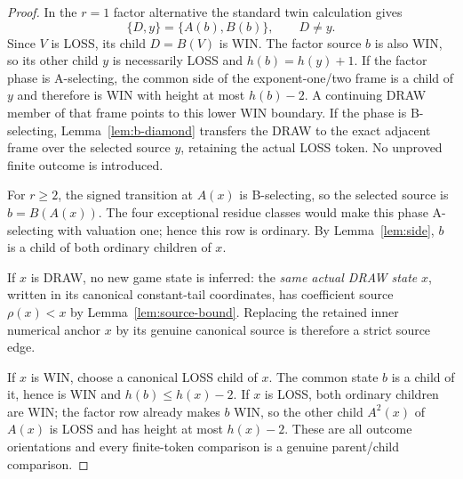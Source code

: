 \documentclass[11pt]{article}
\begin{document}
\begin{proof}
In the $r=1$ factor alternative the standard twin calculation gives
\[
 \{D,y\}=\{A(b),B(b)\},\qquad D\ne y.
\]
Since $V$ is LOSS, its
child $D=B(V)$ is WIN.  The factor source $b$ is also WIN, so its other child
$y$ is necessarily LOSS and $h(b)=h(y)+1$.  If the factor phase is
A-selecting, the common side of the exponent-one/two frame is a child of $y$
and therefore is WIN with height at most $h(b)-2$.  A continuing DRAW member
of that frame points to this lower WIN boundary.  If the phase is B-selecting,
Lemma~\ref{lem:b-diamond} transfers the DRAW to the exact adjacent frame over
the selected source $y$, retaining the actual LOSS token.  No unproved
finite outcome is introduced.

For $r\ge2$, the signed transition at $A(x)$ is B-selecting, so the selected
source is $b=B(A(x))$.  The four exceptional residue classes would make this
phase A-selecting with valuation one; hence this row is ordinary.  By
Lemma~\ref{lem:side}, $b$ is a child of both ordinary children of $x$.

If $x$ is DRAW, no new game state is inferred: the \emph{same actual DRAW
state} $x$, written in its canonical constant-tail coordinates, has coefficient
source $\rho(x)<x$ by Lemma~\ref{lem:source-bound}.  Replacing the retained
inner numerical anchor $x$ by its genuine canonical source is therefore a
strict source edge.

If $x$ is WIN, choose a canonical LOSS child of $x$.  The common state $b$ is
a child of it, hence is WIN and $h(b)\le h(x)-2$.  If $x$ is LOSS, both
ordinary children are WIN; the factor row already makes $b$ WIN, so the other
child $A^2(x)$ of $A(x)$ is LOSS and has height at most $h(x)-2$.  These are
all outcome orientations and every finite-token comparison is a genuine
parent/child comparison.
\end{proof}
\end{document}
